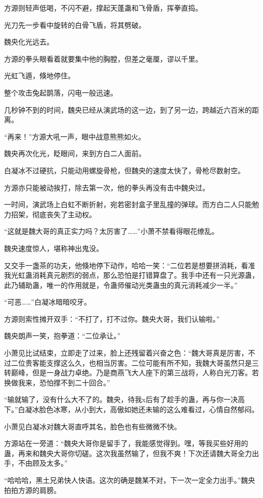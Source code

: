 \begin{this_body}
方源则轻声低喝，不闪不避，撑起天蓬蛊和飞骨盾，挥拳直捣。

光刀先一步看中旋转的白骨飞盾，将其劈破。

魏央化光远去。

方源的拳头眼看着就要集中他的胸膛，但差之毫厘，谬以千里。

光虹飞遁，倏地停住。

整个攻击兔起鹊落，闪电一般迅速。

几秒钟不到的时间，魏央已经从演武场的这一边，到了另一边，跨越近六百米的距离。

“再来！”方源大吼一声，眼中战意熊熊如火。

魏央再次化光，眨眼间，来到方白二人面前。

白凝冰不过硬抗，只能动用螺旋骨枪，但魏央的速度太快了，骨枪尽数射空。

方源亦只能被动挨打，除去第一次，他的拳头再没有击中魏央过。

一时间，演武场上白虹不断折射，宛若密封盒子里乱撞的弹球。而方白二人只能勉力招架，彻底丧失了主动权。

“这就是魏大哥的真正实力吗？太厉害了……”小萧不禁看得眼花缭乱。

魏央速度惊人，堪称神出鬼没。

又交手一盏茶的功夫，他倏地停下动作，哈哈一笑：“二位若是想要拼消耗，看准我光虹蛊消耗真元剧烈的弱点，那么恐怕是打错算盘了。我手中还有一只光源蛊，此乃辅助蛊，唯一的作用就是，令蛊师催动光类蛊虫的真元消耗减少一半。”

“可恶……”白凝冰暗暗咬牙。

方源则索性摊开双手：“不打了，打不过你。魏央大哥，我们认输啦。”

魏央朗声一笑，抱拳道：“二位承让。”

小萧见比试结束，立即走了过来，脸上还残留着兴奋之色：“魏大哥真是厉害，不过二位贵客能支撑这么久，也相当厉害。二位可能有所不知，我魏大哥虽然只是三转巅峰，但是一身战力卓绝。乃是商燕飞大人座下的第三战将，人称白光刀客。若换做我来，恐怕撑不到二十回合。”

“输就输了，没有什么大不了的。魏央，待我x后有了趁手的蛊，再与你一决高下。”白凝冰脸色冰寒，从小到大，高傲如她还未输的这么难看过，心情自然郁闷。

小萧见白凝冰对魏大哥直呼其名，脸色也有些微微不快。

方源站在一旁道：“魏央大哥你是留手了，我能感觉得到。嘿，等我买些好用的蛊，再来和魏央大哥你切磋。这次我虽然输了，但我不爽！下次还请魏大哥全力出手，不由顾及太多。”

“哈哈哈，黑土兄弟快人快语。这次的确是魏某不对，下一次一定全力出手。”魏央拍拍方源的肩膀。


\end{this_body}
